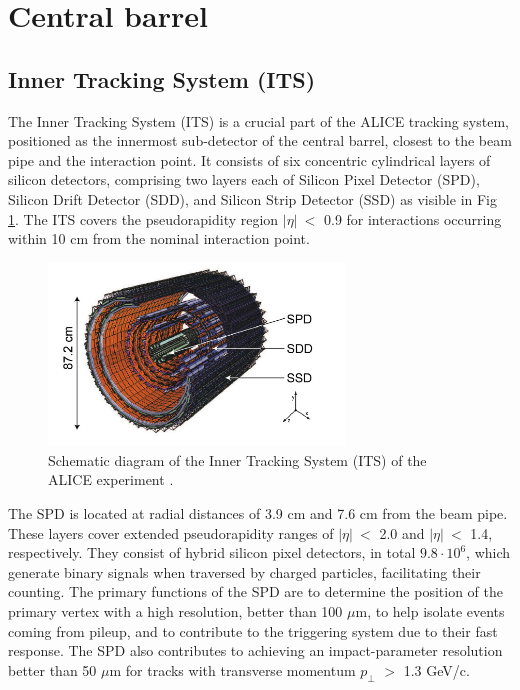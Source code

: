 \documentclass[12pt,a4paper]{book}
\begin{document}
\FloatBarrier	
\section{Central barrel}
\subsection{Inner Tracking System (ITS)}

 The Inner Tracking System (ITS) is a crucial part of the ALICE tracking system, positioned as the innermost sub-detector of the central barrel, closest to the beam pipe and the interaction point. It consists of six concentric cylindrical layers of silicon detectors, comprising two layers each of Silicon Pixel Detector (SPD), Silicon Drift Detector (SDD), and Silicon Strip Detector (SSD) as visible in Fig \ref{fig:ITS_schematic}. The ITS covers the pseudorapidity region $|\eta|\ <$ 0.9 for interactions occurring within 10 cm from the nominal interaction point.
\begin{figure}[h]
	\centering
	\includegraphics[width=0.7\textwidth]{pictures/ITS_schematic.png}
	\caption{Schematic diagram of the Inner Tracking System (ITS) of the ALICE experiment \cite{collaboration_2010}.}
	\label{fig:ITS_schematic}
\end{figure}
The  SPD is located at radial distances of 3.9 cm and 7.6 cm from the beam pipe. These layers cover extended pseudorapidity ranges of $|\eta|\ <$ 2.0 and $|\eta|\ <$ 1.4, respectively. They consist of hybrid silicon pixel detectors, in total $9.8 \cdot 10^6$, which generate binary signals when traversed by charged particles, facilitating their counting. The primary functions of the SPD are to determine the position of the primary vertex with a high resolution, better than 100 $\mu$m, to help isolate events coming from pileup, and to contribute to the triggering system due to their fast response. The SPD also contributes to achieving an impact-parameter resolution better than 50 $\mu$m for tracks with transverse momentum $p_\perp$ $>$ 1.3 GeV/c.
\end{document}
